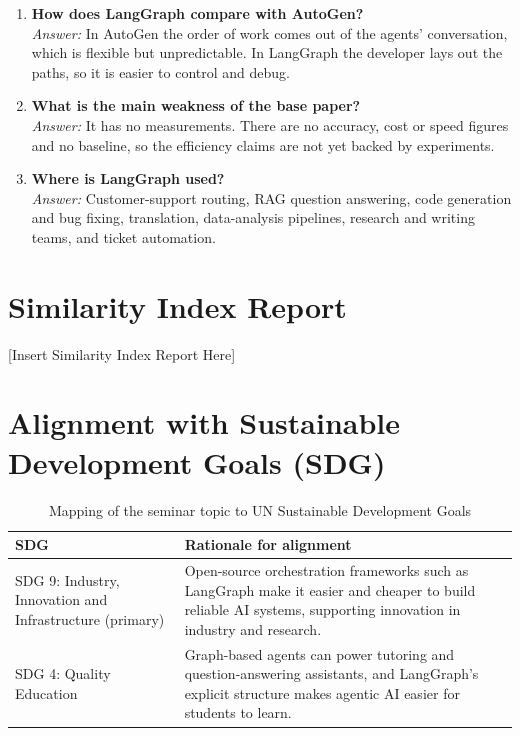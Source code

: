\documentclass[12pt,a4paper]{report}
\begin{document}
\begin{enumerate}[leftmargin=*, itemsep=6pt]
    \item \textbf{How does LangGraph compare with AutoGen?}\\
    \textit{Answer:} In AutoGen the order of work comes out of the agents' conversation, which is flexible but unpredictable. In LangGraph the developer lays out the paths, so it is easier to control and debug.

    \item \textbf{What is the main weakness of the base paper?}\\
    \textit{Answer:} It has no measurements. There are no accuracy, cost or speed figures and no baseline, so the efficiency claims are not yet backed by experiments.

    \item \textbf{Where is LangGraph used?}\\
    \textit{Answer:} Customer-support routing, RAG question answering, code generation and bug fixing, translation, data-analysis pipelines, research and writing teams, and ticket automation.
\end{enumerate}

\chapter{Similarity Index Report}
[Insert Similarity Index Report Here]

\chapter{Alignment with Sustainable Development Goals (SDG)}

\begin{table}[H]
\centering
\renewcommand{\arraystretch}{1.4}
\caption{Mapping of the seminar topic to UN Sustainable Development Goals}
\label{tab:sdg}
\begin{tabular}{|L{4.5cm}|L{9.5cm}|}
\hline
\textbf{SDG} & \textbf{Rationale for alignment} \\\hline
SDG 9: Industry, Innovation and Infrastructure (primary) & Open-source orchestration frameworks such as LangGraph make it easier and cheaper to build reliable AI systems, supporting innovation in industry and research. \\\hline
SDG 4: Quality Education & Graph-based agents can power tutoring and question-answering assistants, and LangGraph's explicit structure makes agentic AI easier for students to learn. \\\hline
\end{tabular}
\end{table}
\end{document}
